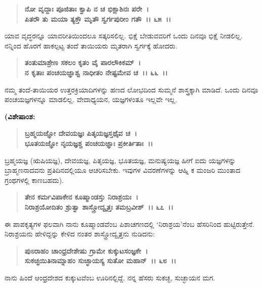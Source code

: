 \begin{verse}
\textbf{ನೋ ವೃದ್ದಾಃ ಪೂಜಿತಾಃ ಕ್ವಾಪಿ ನ ಚ ಭಿಕ್ಷಾಶಿನಃ ಪರೇ~।}\\\textbf{ಪಿತರೌ ತು ಮಯಾ ತ್ಯಕ್ತೌ ಮೃತೌ ಸ್ವರ್ಗಪುರೀಂ ಗತೌ~।। ೬೫~।।}
\end{verse}

ಯಾವ ವೃದ್ಧರನ್ನೂ ಯಾವರೀತಿಯಿಂದಲೂ ಸತ್ಕರಿಸಲಿಲ್ಲ. ಭಿಕ್ಷೆ ಬೇಡುವವರಿಗೆ ಒಂದು ದಿನವೂ ಭಿಕ್ಷೆ ನೀಡಲಿಲ್ಲ. ನನ್ನಿಂದ ಹೊರಗೆ ಹಾಕಲ್ಪಟ್ಟ ತಂದೆ ತಾಯಿಯರು ಮೃತರಾಗಿ ಸ್ವರ್ಗಕ್ಕೆ ಹೋದರು.

\begin{verse}
\textbf{ತಂತುಮಾಶ್ರೇಣ ಸಕಲಂ ಕೃತಂ ವೈ ಪಾರಲೌಕಿಕಮ್~।}\\\textbf{ನ ಕೃತಾಃ ಪಂಚಯಜ್ಞಾಶ್ವ ನಾಧೀತಂ ನೇಷ್ಟಮೇವ ಚ~।। ೬೬~।।}
\end{verse}

ನಮ್ಮ ತಂದೆ-ತಾಯಿಯರ ಉತ್ತರಕ್ರಿಯಾದಿಗಳನ್ನು ಹಣದ ಲೋಭದಿಂದ ಸುಮ್ಮನೆ ಶಾಸ್ತ್ರಕ್ಕಾಗಿ ಮಾಡಿದೆ. ಒಂದು ದಿನವೂ ಪಂಚಯಜ್ಞಗಳನ್ನೂ ಮಾಡಲಿಲ್ಲ. ವೇದಾಧ್ಯಯನ, ಯಜ್ಞಗಳಂತೂ ಇಲ್ಲವೇ ಇಲ್ಲ.

\begin{flushleft}
\textbf{(ವಿಶೇಷಾಂಶ:\enginline{-}}
\end{flushleft}

\begin{verse}
\textbf{ಬ್ರಹ್ಮಯಜ್ಞೋ ದೇವಯಜ್ಞಃ ಪಿತೃಯಜ್ಞಸ್ತಥೈವ ಚ~।}\\\textbf{ಭೂತಯಜ್ಞೋ ನೃಯಜ್ಞಶ್ಚ ಪಂಚಯಜ್ಞಾಃ ಪ್ರಕೀರ್ತಿತಾಃ~।।}
\end{verse}

ಬ್ರಹ್ಮಯಜ್ಞ (ಋಷಿಯಜ್ಞ), ದೇವಯಜ್ಞ, ಪಿತೃಯಜ್ಞ, ಭೂತಯಜ್ಞ, ಮನುಷ್ಯಯಜ್ಞ ಹೀಗೆ ಐದು ಯಜ್ಞಗಳನ್ನು ಬ್ರಾಹ್ಮಣನಾದವನು ಪ್ರತಿದಿನದಲ್ಲಿಯೂ ಆಚರಿಸಬೇಕು. ಇವುಗಳ ವಿವರಣೆಗಳನ್ನು ಆಹ್ನಿ ಕ ಮಂಜರಿ ಮುಂತಾದ ಗ್ರಂಥಗಳಲ್ಲಿ ಕಾಣಬಹದು).

\begin{verse}
\textbf{ತೇನ ಕರ್ಮವಿಪಾಕೇನ ಕೂಷ್ಮಾಂಡಸ್ತು ನಿರಾಶ್ರಯಃ~।}\\\textbf{ನಿರಾಶ್ರಯೋದಿತಂ ಶ್ರುತ್ವಾ ಶಾಸ್ತ್ರೋದ್ವೃತ್ತಃ ತಮಬ್ರವೀಶ್~।। ೬೭~।।}
\end{verse}

ಈ ಪಾಪಕೃತ್ಯಗಳ ಫಲವಾಗಿ ನಾನು ಕೂಷ್ಮಾಂಡವೆಂಬ ಪಿಶಾಚಗಣದಲ್ಲಿ `ನಿರಾಶ್ರಯ'ನೆಂಬ ಹೆಸರಿನಿಂದ ಹುಟ್ಟಿರುತ್ತೇನೆ. ನಿರಾಶ್ರಯನು ಹೇಳಿದ್ದನ್ನು ಕೇಳಿದ ನಂತರ ಶಾಸ್ತ್ರೋದ್ವೃತ್ತನು ನುಡಿದನು:

\begin{verse}
\textbf{ಪುಽರಾಹಂ ಚಾಂಧ್ರದೇಶೇಷು ಗ್ರಾಮೇ ಕುಕ್ಕುಟಸಂಜ್ಞಕೇ~।}\\\textbf{ಸುಕಚ್ಛಯಿತಿನಾಮ್ನಾಹಂ ಸುಚ್ಛಾಯಸ್ಯ ಸುತೋ ಮಹಾನ್~।। ೬೮~।।}
\end{verse}

ನಾನು ಹಿಂದೆ ಆಂಧ್ರದೇಶದ ಕುಕ್ಕುಟವೆಂಬ ಊರಿನಲ್ಲಿದ್ದೆ. ನನ್ನ ಹೆಸರು ಸುಕಚ್ಛ, ಸುಚ್ಛಾಯನ ಮಗ.

